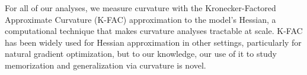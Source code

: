 \documentclass{article} %
\begin{document}
For all of our analyses, we measure curvature with the Kronecker-Factored Approximate Curvature (K-FAC) approximation to the model’s Hessian, a computational technique that makes curvature analyses tractable at scale. K-FAC has been widely used for Hessian approximation in other settings, particularly for natural gradient optimization, but to our knowledge, our use of it to study memorization and generalization via curvature is novel.

\end{document}
